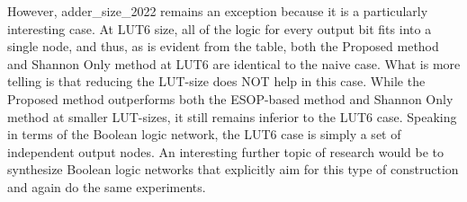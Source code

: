 However, adder\_size\_2022 remains an exception because it is a particularly interesting case. At LUT6 size,
all of the logic for every output bit fits into a single node, and thus, as is evident from the table,
both the Proposed method and Shannon Only method at LUT6 are identical to the naive case. What is more telling is
that reducing the LUT-size does NOT help in this case. While the Proposed method outperforms both the ESOP-based
method and Shannon Only method at smaller LUT-sizes, it still remains inferior to the LUT6 case. Speaking in terms
of the Boolean logic network, the LUT6 case is simply a set of independent output nodes. An interesting further topic of research would be
to synthesize Boolean logic networks that explicitly aim for this type of construction and again do the same experiments. 


